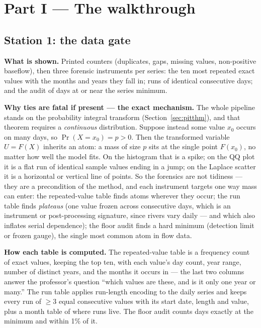 \documentclass[11pt]{article}
\begin{document}
\section*{Part I --- The walkthrough}

\subsection{Station 1: the data gate}
\label{sec:datagate}

\textbf{What is shown.} Printed counters (duplicates, gaps, missing values,
non-positive baseflow), then three forensic instruments per series: the ten
most repeated exact values with the months and years they fall in; runs of
identical consecutive days; and the audit of days at or near the series
minimum.

\textbf{Why ties are fatal if present --- the exact mechanism.} The whole
pipeline stands on the probability integral transform
(Section~\ref{sec:pitthm}), and that theorem requires a \emph{continuous}
distribution. Suppose instead some value $x_0$ occurs on many days, so
$\Pr(X = x_0) = p > 0$. Then the transformed variable $U = F(X)$ inherits an
atom: a mass of size $p$ sits at the single point $F(x_0)$, no matter how well
the model fits. On the histogram that is a spike; on the QQ plot it is a flat
run of identical sample values ending in a jump; on the Laplace scatter it is
a horizontal or vertical line of points. So the forensics are not tidiness ---
they are a precondition of the method, and each instrument targets one way
mass can enter: the repeated-value table finds atoms wherever they occur; the
run table finds \emph{plateaus} (one value frozen across consecutive days,
which is an instrument or post-processing signature, since rivers vary daily
--- and which also inflates serial dependence); the floor audit finds a hard
minimum (detection limit or frozen gauge), the single most common atom in
flow data.

\textbf{How each table is computed.} The repeated-value table is a frequency
count of exact values, keeping the top ten, with each value's day count, year
range, number of distinct years, and the months it occurs in --- the last two
columns answer the professor's question ``which values are these, and is it
only one year or many.'' The run table applies run-length encoding to the
daily series and keeps every run of $\ge 3$ equal consecutive values with its
start date, length and value, plus a month table of where runs live. The
floor audit counts days exactly at the minimum and within 1\% of it.
\end{document}
